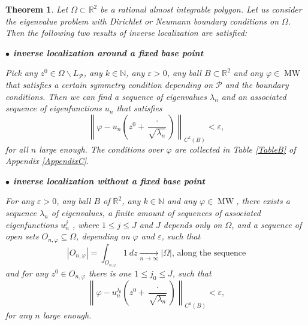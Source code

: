 \documentclass{amsart}
\newtheorem{theorem}{Theorem}[section]
\theoremstyle{definition}
\theoremstyle{remark}
\newcommand{\ep}{\varepsilon}
\newcommand{\vp}{\varphi}
\def\RR{\mathbb{R}}
\renewcommand\leq\leqslant
\numberwithin{equation}{section}
\theoremstyle{definition}
\theoremstyle{remark}
\def\RR{\mathbb{R}}
\DeclareMathOperator\MW{MW}
\begin{document}
\begin{theorem}\label{ILlat}
	Let $\Omega\subset\RR^2$ be a rational almost integrable polygon. Let us consider the eigenvalue problem with Dirichlet or Neumann boundary conditions on $\Omega$. Then the following two results of inverse localization are satisfied:
	
\textbf{$\bullet$ inverse localization around a fixed base point}

Pick any $z^0\in \Omega\backslash L_\mathcal{P}$, any $k\in\mathbb{N}$, any $\ep>0$, any ball $B\subset \mathbb{R}^2$ and any $\vp\in\MW$ that satisfies a certain symmetry condition depending on $\mathcal{P}$ and the boundary conditions. 
Then we can find a sequence of eigenvalues $\lambda_n$ and an associated sequence of eigenfunctions $u_{n}$ that satisfies  \begin{equation}
	\left\|\vp-u_{n}\left(z^0+\frac{\cdot}{\sqrt{\lambda_n}}\right)\right\|_{C^k(B)}<\ep,
\end{equation}for all $n$ large enough. The conditions over $\vp$ are collected in Table \eqref{TableB} of  Appendix \ref{AppendixC}.

\textbf{$\bullet$ inverse localization without a fixed base point}

For any $\ep>0$, any ball $B$ of $\mathbb{R}^2$, any $k\in\mathbb{N}$ and any $\vp\in\MW$, there exists a sequence $\lambda_n$ of eigenvalues, a finite amount of sequences of associated eigenfunctions $u_{n}^j$ , where $1\leq j\leq J$ and $J$ depends only on $\Omega$, and a sequence of open sets $O_{n,\varphi}\subseteq \Omega$, depending on $\varphi$ and $\ep$, such that \begin{equation}
	|O_{n,\varphi}|=\int_{O_{n,\varphi}}1\ dz\xrightarrow[n\rightarrow\infty]{}\left|\Omega\right|\text{, along the sequence}
\end{equation}and for any $z^0\in O_{n,\varphi}$ there is one $1\leq j_0\leq J$, such that  \begin{equation}
	\left\|\vp-u^{j_0}_{n}\left(z^0+\frac{\cdot}{\sqrt{\lambda_n}}\right)\right\|_{C^k(B)}<\ep,
\end{equation}for any $n$ large enough.

\end{theorem}
\end{document}
